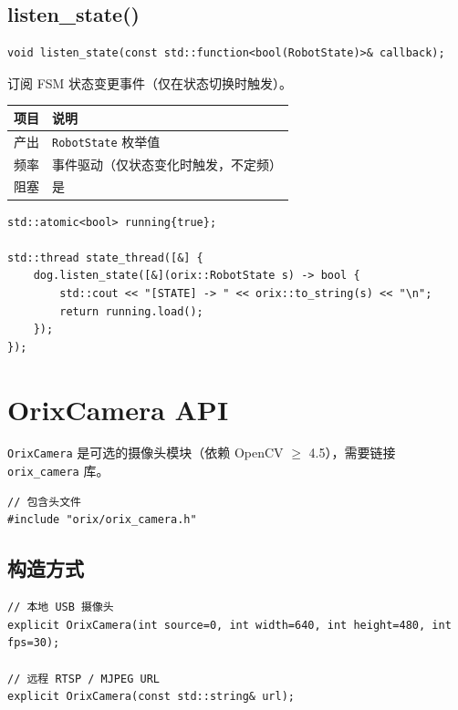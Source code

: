 \documentclass[a4paper,11pt,openany]{book}
\begin{document}
\subsection{listen\_state()}

\begin{lstlisting}[style=cpp,numbers=none]
void listen_state(const std::function<bool(RobotState)>& callback);
\end{lstlisting}

订阅 FSM 状态变更事件（仅在状态切换时触发）。

\begin{longtable}{ll}
\toprule
项目 & 说明 \\
\midrule
\endhead
产出 & \texttt{RobotState} 枚举值 \\
频率 & 事件驱动（仅状态变化时触发，不定频）\\
阻塞 & 是 \\
\bottomrule
\end{longtable}

\begin{lstlisting}[style=cpp]
std::atomic<bool> running{true};

std::thread state_thread([&] {
    dog.listen_state([&](orix::RobotState s) -> bool {
        std::cout << "[STATE] -> " << orix::to_string(s) << "\n";
        return running.load();
    });
});
\end{lstlisting}

\section{OrixCamera API}

\texttt{OrixCamera} 是可选的摄像头模块（依赖 OpenCV $\geq$ 4.5），需要链接 \texttt{orix\_camera} 库。

\begin{lstlisting}[style=cpp,numbers=none]
// 包含头文件
#include "orix/orix_camera.h"
\end{lstlisting}

\subsection{构造方式}

\begin{lstlisting}[style=cpp,numbers=none]
// 本地 USB 摄像头
explicit OrixCamera(int source=0, int width=640, int height=480, int fps=30);

// 远程 RTSP / MJPEG URL
explicit OrixCamera(const std::string& url);
\end{lstlisting}
\end{document}
